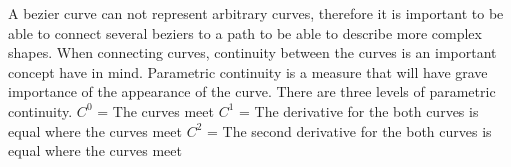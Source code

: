 A bezier curve can not represent arbitrary curves, therefore it is important to be able to connect several beziers to a path to be able to describe more complex shapes. When connecting curves, continuity between the curves is an important concept have in mind. Parametric continuity is a measure that will have grave importance of the appearance of the curve. There are three levels of parametric continuity.\vspace{\baselineskip}\newline
\begin{math}C^0\end{math} = The curves meet\newline
\begin{math}C^1\end{math} = The derivative for the both curves is equal where the curves meet\newline
\begin{math}C^2\end{math} = The second derivative for the both curves is equal where the curves meet\vspace{\baselineskip} \newline
